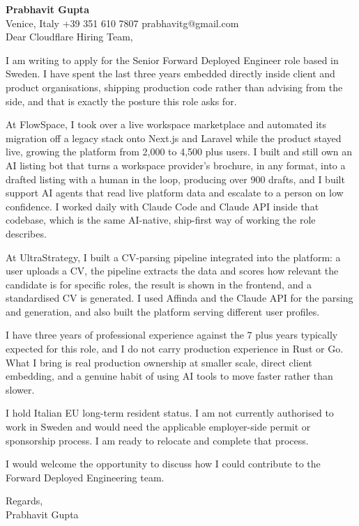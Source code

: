 \documentclass[a4paper,10.5pt]{article}
\begin{document}
\textbf{Prabhavit Gupta}\\
Venice, Italy \textbar{} +39 351 610 7807 \textbar{} prabhavitg@gmail.com\\[10pt]
Dear Cloudflare Hiring Team,

I am writing to apply for the Senior Forward Deployed Engineer role based in Sweden. I have spent the last three years embedded directly inside client and product organisations, shipping production code rather than advising from the side, and that is exactly the posture this role asks for.

At FlowSpace, I took over a live workspace marketplace and automated its migration off a legacy stack onto Next.js and Laravel while the product stayed live, growing the platform from 2,000 to 4,500 plus users. I built and still own an AI listing bot that turns a workspace provider's brochure, in any format, into a drafted listing with a human in the loop, producing over 900 drafts, and I built support AI agents that read live platform data and escalate to a person on low confidence. I worked daily with Claude Code and Claude API inside that codebase, which is the same AI-native, ship-first way of working the role describes.

At UltraStrategy, I built a CV-parsing pipeline integrated into the platform: a user uploads a CV, the pipeline extracts the data and scores how relevant the candidate is for specific roles, the result is shown in the frontend, and a standardised CV is generated. I used Affinda and the Claude API for the parsing and generation, and also built the platform serving different user profiles.

I have three years of professional experience against the 7 plus years typically expected for this role, and I do not carry production experience in Rust or Go. What I bring is real production ownership at smaller scale, direct client embedding, and a genuine habit of using AI tools to move faster rather than slower.

I hold Italian EU long-term resident status. I am not currently authorised to work in Sweden and would need the applicable employer-side permit or sponsorship process. I am ready to relocate and complete that process.

I would welcome the opportunity to discuss how I could contribute to the Forward Deployed Engineering team.

Regards,\\
Prabhavit Gupta
\end{document}
